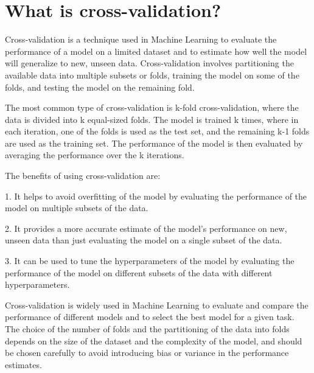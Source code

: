 \section{What is cross-validation?}
Cross-validation is a technique used in Machine Learning to evaluate the performance of a model on a limited dataset and to estimate how well the model will generalize to new, unseen data. Cross-validation involves partitioning the available data into multiple subsets or folds, training the model on some of the folds, and testing the model on the remaining fold.

The most common type of cross-validation is k-fold cross-validation, where the data is divided into k equal-sized folds. The model is trained k times, where in each iteration, one of the folds is used as the test set, and the remaining k-1 folds are used as the training set. The performance of the model is then evaluated by averaging the performance over the k iterations.

The benefits of using cross-validation are:

1. It helps to avoid overfitting of the model by evaluating the performance of the model on multiple subsets of the data.

2. It provides a more accurate estimate of the model's performance on new, unseen data than just evaluating the model on a single subset of the data.

3. It can be used to tune the hyperparameters of the model by evaluating the performance of the model on different subsets of the data with different hyperparameters.

Cross-validation is widely used in Machine Learning to evaluate and compare the performance of different models and to select the best model for a given task. The choice of the number of folds and the partitioning of the data into folds depends on the size of the dataset and the complexity of the model, and should be chosen carefully to avoid introducing bias or variance in the performance estimates.

